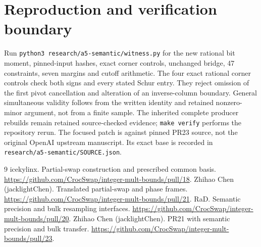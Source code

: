 \documentclass[11pt]{article}
\begin{document}
\section{Reproduction and verification boundary}
Run \texttt{python3 research/a5-semantic/witness.py} for the new rational
bit moment, pinned-input hashes, exact corner controls, unchanged bridge,
47 constraints, seven margins and cutoff arithmetic. The four exact
rational corner controls check both signs and every stated Schur entry.
They reject omission of the first pivot cancellation and alteration of
an inverse-column boundary. General simultaneous validity follows from
the written identity and retained nonzero-minor argument, not from a
finite sample. The inherited complete producer rebuilds remain retained
source-checked evidence; \texttt{make verify} performs the repository rerun.
The focused patch is against pinned PR23 source, not the original OpenAI
upstream manuscript. Its exact base is recorded in
\texttt{research/a5-semantic/SOURCE.json}.

\begin{thebibliography}{9}
 icekylinx. Partial-swap construction and prescribed common basis.
\url{https://github.com/CrocSwap/integer-mult-bounds/pull/18}.
 Zhihao Chen (jacklightChen). Translated partial-swap and phase frames.
\url{https://github.com/CrocSwap/integer-mult-bounds/pull/21}.
 RaD. Semantic precision and bulk resampling interfaces.
\url{https://github.com/CrocSwap/integer-mult-bounds/pull/20}.
 Zhihao Chen (jacklightChen). PR21 with semantic precision and bulk transfer.
\url{https://github.com/CrocSwap/integer-mult-bounds/pull/23}.
\end{thebibliography}
\end{document}
